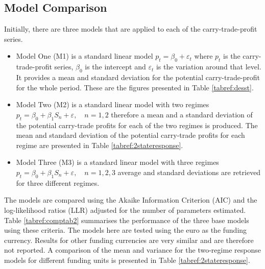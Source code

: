 \documentclass[12pt, a4paper, oneside]{article}\usepackage[]{graphicx}\usepackage[]{color}
\begin{document}
\subsection{Model Comparison}
Initially, there are three models that are applied to each of the carry-trade-profit series. 
\begin{itemize}
\item Model One (M1) is a standard linear model $p_t = \beta_0  + \varepsilon_t$ where $p_t$ is the carry-trade-profit series, $\beta_0$ is the intercept and $\varepsilon_t$ is the variation around that level.  It provides a mean and standard deviation for the potential carry-trade-profit for the whole period.  These are the figures presented in Table \ref{tabref:desst}.
\item Model Two (M2) is a standard linear model with two regimes $p_t = \beta_0 + \beta_1 S_n + \varepsilon, \quad n = 1, 2$ therefore a mean and a standard deviation of the potential carry-trade profits for each of the two regimes is produced.  The mean and standard deviation of the potential carry-trade profits for each regime are presented in Table \ref{tabref:2stateresponse}.
\item Model Three (M3) is a standard linear model with three regimes $p_t = \beta_0 + \beta_1 S_n + \varepsilon, \quad n = 1, 2, 3$ average and standard deviations are retrieved for three different regimes. 
\end{itemize}

The models are compared using the Akaike Information Criterion (AIC) and the log-likelihood ratios (LLR) adjusted for the number of parameters estimated.  Table \ref{tabref:comptab2} summarises the performance of the three base models using these criteria. The models here are tested using the euro as the funding currency.  Results for other funding currencies are very similar and are therefore not reported.  A comparison of the mean and variance for the two-regime response models for different funding units is presented in Table \ref{tabref:2stateresponse}. 
\end{document}
